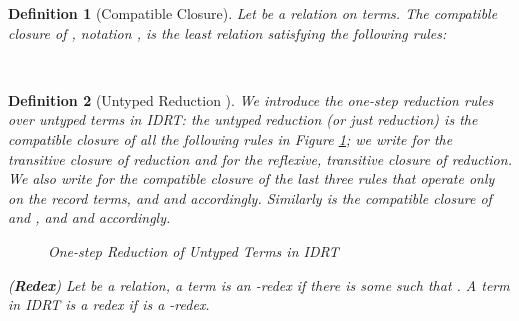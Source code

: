 \documentclass[submission,copyright,creativecommons]{eptcs}
\newcommand{\selfcomment}[1]{\ifodd 0 {\sf #1 }\fi}
\newcommand{\selfc}{\selfcomment}
\newtheorem{definition}{Definition}[section]
\begin{document}
\selfc{
\begin{definition}[Compatible Closure] \label{comp-clos}
Let  be a relation on terms.   The \emph{compatible closure} of , notation , is the least relation satisfying the following rules:





\\
\end{definition}




\begin{definition}[Untyped Reduction ] \label{un-red}
We introduce the one-step reduction rules over untyped terms in IDRT:
the untyped reduction (or just reduction)  is the compatible closure of all the following rules in Figure \ref{Untyped-reduction}; we write  for the transitive closure of reduction and  for the reflexive, transitive closure of reduction. We also write  for the compatible closure of the last three rules that operate only on the record terms, and  and  accordingly. Similarly  is the compatible closure of  and , and  and  accordingly. \\
\begin{figure}[here]
\framebox[5.8in][c]{
\begin{minipage}{\linewidth}

\end{minipage}
} \caption{One-step Reduction of Untyped Terms in IDRT} \label{Untyped-reduction}
\end{figure}
(\textbf{Redex}) Let  be a relation, a term  is an -redex if there is some  such that . A term  in IDRT is a redex if  is a -redex. \\
\end{definition}

}
\end{document}
